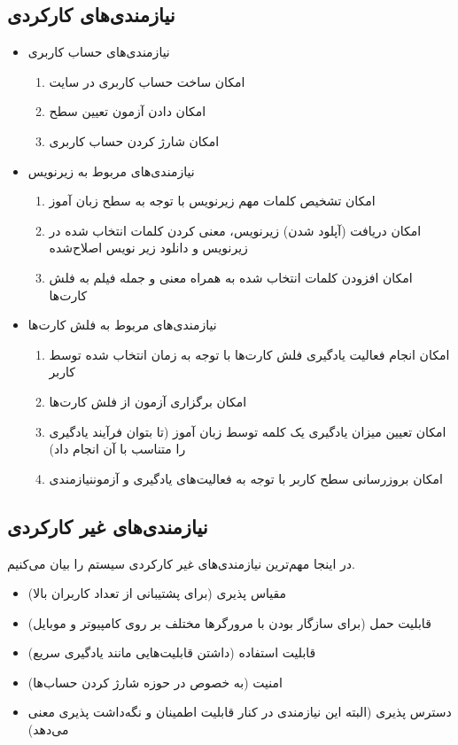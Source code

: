   \subsection{نیازمندی‌های کارکردی}
  \begin{itemize}
  	\item نیازمندی‌های حساب کاربری
  	\begin{enumerate}
  	\item امکان ساخت حساب کاربری در سایت
  	\item امکان دادن آزمون تعیین سطح
  	\item امکان شارژ کردن حساب کاربری
  	\end{enumerate}
  	\item نیازمندی‌های مربوط به زیرنویس
  	\begin{enumerate}
  	\item امکان تشخیص کلمات مهم زیرنویس با توجه به سطح زبان آموز
  	\item امکان دریافت (آپلود شدن) زیرنویس، معنی کردن کلمات انتخاب شده در زیرنویس و دانلود زیر نویس اصلاح‌شده
  	\item امکان افزودن کلمات انتخاب شده به همراه معنی و جمله فیلم به فلش‌ کارت‌ها
  	\end{enumerate}
  	\item نیازمندی‌های مربوط به فلش کارت‌ها
  	\begin{enumerate}
  	\item امکان انجام فعالیت یادگیری فلش کارت‌ها با توجه به زمان انتخاب شده توسط کاربر
  	\item امکان برگزاری آزمون از فلش کارت‌ها
  	\item  امکان تعیین میزان یادگیری یک کلمه توسط زبان آموز (تا بتوان فرآیند یادگیری را متناسب با آن انجام داد)
  	\item امکان بروزرسانی سطح کاربر با توجه به فعالیت‌های یادگیری و آزموننیازمندی 
  	\end{enumerate}
  \end{itemize} 
  \subsection{نیازمندی‌های غیر کارکردی}
  در اینجا مهم‌ترین نیازمندی‌های غیر کارکردی سیستم را بیان می‌کنیم.
  \begin{itemize}
  	\item مقیاس پذیری (برای پشتیبانی از تعداد کاربران بالا)
  	\item قابلیت حمل (برای سازگار بودن با مرورگر‌ها مختلف بر روی کامپیوتر و موبایل)
  	\item قابلیت استفاده (داشتن قابلیت‌هایی مانند یادگیری سریع)
  	\item امنیت (به خصوص در حوزه شارژ کردن حساب‌ها) 
  	\item دسترس پذیری (البته این نیاز‌مندی در کنار  قابلیت اطمینان و نگه‌داشت پذیری معنی می‌دهد)
  \end{itemize}

